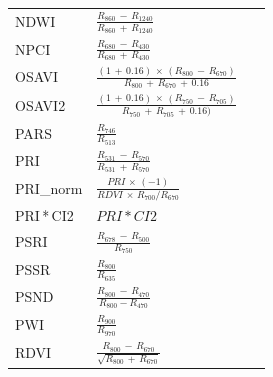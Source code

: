 \documentclass[remotesensing,article,accept,moreauthors,pdftex]{Definitions/mdpi}
\begin{document}
\begin{paracol}{2}
\begin{specialtable}[H]
{\begin{tabular}{lll}
		NDWI            & $\frac{R_{860}\,-\,R_{1240}}{R_{860}\,+\,R_{1240}}$                                                          &~\cite{gao1996}                \\
		NPCI            & $\frac{R_{680}\,-\,R_{430}}{R_{680}\,+\,R_{430}}$                                                            &~\cite{penuelas1994}           \\
		OSAVI           & $\frac{(1\,+\,0.16) \,\times\, (R_{800}\,-\,R_{670})}{R_{800}\,+\,R_{670}\,+\,0.16 }$                                    &~\cite{rondeaux1996}           \\
		OSAVI2          & $\frac{(1\,+\,0.16)\,\times\, (R_{750}\,-\,R_{705})}{R_{750}\,+\,R_{705}\,+\,0.16) }$                                    &~\cite{wu2008}                \\
		PARS            & $\frac{R_{746}}{R_{513}}$                                                                            &~\cite{chappelle1992}          \\
		PRI             & $\frac{R_{531}\,-\,R_{570}}{R_{531}\,+\,R_{570}}$                                                            &~\cite{gamon1992}              \\
		PRI\_norm       & $\frac{PRI \,\times\, (-1) }{RDVI\,\times\, R_{700}/R_{670}}$                                                &~\cite{zarco-tejada2013}      \\
		PRI\,*\,CI2         & $PRI*CI2$                                                                                            &~\cite{garrity2011}            \\
		PSRI            & $\frac{R_{678}\,-\,R_{500}}{R_{750}}$                                                                    &~\cite{merzlyak1999}           \\
		PSSR            & $\frac{R_{800}}{R_{635}}$                                                                            &~\cite{blackburn1998}          \\
		PSND            & $\frac{R_{800}\,-\,R_{470}}{R_{800}-R_{470}}$                                                           &~\cite{blackburn1998}          \\
		PWI             & $\frac{R_{900}}{R_{970}}$                                                                            &~\cite{penuelas1997}           \\
		RDVI            & $\frac{R_{800}\,-\,R_{670}}{ \sqrt{R_{800}\,+\,R_{670}}}$                                                    &~\cite{roujean1995}            \\

\end{tabular}}
\end{specialtable}
\end{paracol}
\end{document}
